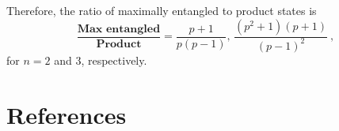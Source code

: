 \documentclass{iopart}
\begin{document}
Therefore, the ratio of maximally entangled to product states is
\[
\frac{\textbf{Max entangled}}{\textbf{Product}}=\frac{p+1}{p\left(p-1\right)} ,\, \frac{\left(p^2+1\right)\left(p+1\right)}{\left(p-1\right)^2} \ ,
\]
for $n=2$ and $3$, respectively.



\section*{References}

{}



\end{document}
